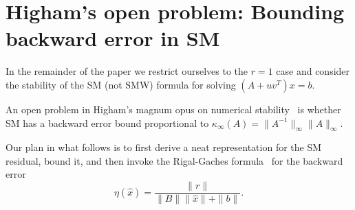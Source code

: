 \documentclass{siamltex}
\begin{document}
\section{Higham's open problem: Bounding backward error in SM}
In the remainder of the paper we restrict ourselves to the $r=1$ case and consider the stability of the SM (not SMW) formula for solving $(A+uv^T)x=b$.

An open problem in Higham's magnum opus on numerical stability~\cite[p. 570]{Higham02} is whether SM has a backward error bound proportional to $\kappa_{\infty}(A) = \|A^{-1}\|_{\infty} \|A\|_{\infty}$. 

Our plan in what follows is to first derive a neat representation for the SM residual, bound it, and then invoke the Rigal-Gaches formula~\cite{Rigal67} for the backward error~\cite[Lem.~1.1]{Higham02} 
\begin{equation}
\label{berr_formula:eq}
\eta(\hat x) = \frac{\|r\|}{\|B\| \|\hat x\| + \|b\|}.
\end{equation}
\end{document}
